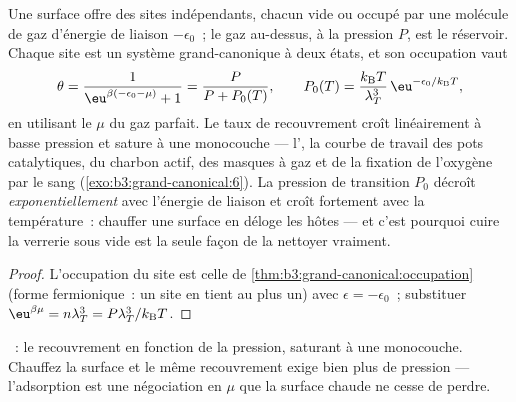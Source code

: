 \begin{proposition}\label{prop:b3:grand-canonical:langmuir}
Une surface offre des sites indépendants, chacun vide ou occupé par
une molécule de gaz d'énergie de liaison $-\epsilon_0$~; le gaz
au-dessus, à la pression $P$, est le réservoir. Chaque site est un
système grand-canonique à deux états, et son occupation vaut
\[
\theta = \frac{1}{\eu^{\beta(-\epsilon_0 - \mu)} + 1}
 = \frac{P}{P + P_0(T)} , \qquad
P_0(T) = \frac{k_{\text{B}}T}{\lambda_T^3}\,
\eu^{-\epsilon_0/k_{\text{B}}T} ,
\]
en utilisant le $\mu$ du gaz parfait. Le taux de recouvrement croît
linéairement à basse pression et sature à une monocouche ---
l'\emph{}, la courbe de travail des pots
catalytiques, du charbon actif, des masques à gaz et de la fixation de
l'oxygène par le sang (\cref{exo:b3:grand-canonical:6}). La pression
de transition $P_0$ décroît \emph{exponentiellement} avec l'énergie de
liaison et croît fortement avec la température~: chauffer une surface
en déloge les hôtes --- et c'est pourquoi cuire la verrerie sous vide
est la seule façon de la nettoyer vraiment.
\end{proposition}

\begin{proof}
L'occupation du site est celle de
\cref{thm:b3:grand-canonical:occupation} (forme fermionique~: un site
en tient au plus un) avec $\epsilon = -\epsilon_0$~; substituer
$\eu^{\beta\mu} = n\lambda_T^3 = P\lambda_T^3/k_{\text{B}}T$.
\end{proof}

\begin{omfigure}

{\small {}~: le recouvrement en fonction de la
pression, saturant à une monocouche. Chauffez la surface et le même
recouvrement exige bien plus de pression --- l'adsorption est une
négociation en $\mu$ que la surface chaude ne cesse de perdre.}
\end{omfigure}

